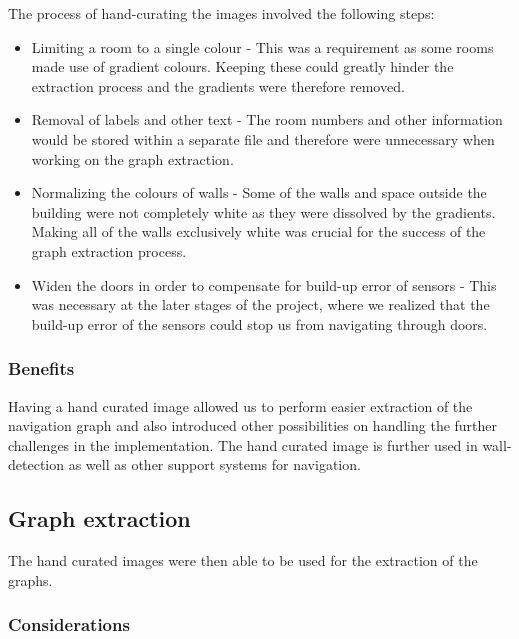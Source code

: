 \documentclass[12pt,a4paper]{report}
\begin{document}
The process of hand-curating the images involved the following steps:

\begin{itemize}

\item Limiting a room to a single colour - This was a requirement as some rooms made use of gradient colours. Keeping these could greatly hinder the extraction process and the gradients were therefore removed.

\item Removal of labels and other text - The room numbers and other information would be stored within a separate file and therefore were unnecessary when working on the graph extraction.
			
\item Normalizing the colours of walls - Some of the walls and space outside the building were not completely white as they were dissolved by the gradients. Making all of the walls exclusively white was crucial for the success of the graph extraction process.
			
\item Widen the doors in order to compensate for build-up error of sensors - This was necessary at the later stages of the project, where we realized that the build-up error of the sensors could stop us from navigating through doors.
\end{itemize}
		
\subsubsection{Benefits}

Having a hand curated image allowed us to perform easier extraction of the navigation graph and also introduced other possibilities on handling the further challenges in the implementation. The hand curated image is further used in wall-detection as well as other support systems for navigation. 
		
\subsection{Graph extraction}

The hand curated images were then able to be used for the extraction of the graphs.

\subsubsection{Considerations}
\end{document}
